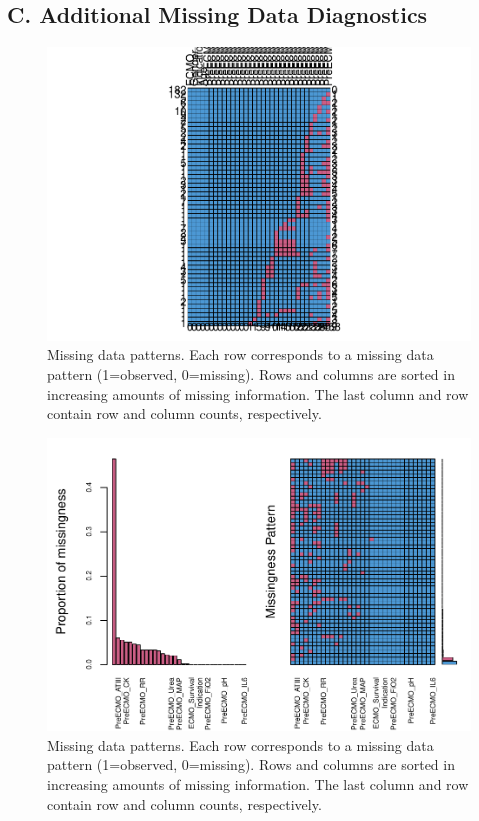 \documentclass[12pt,]{article}
\begin{document}
\subsection{C. Additional Missing Data
Diagnostics}\label{c.-additional-missing-data-diagnostics}

\begin{figure}[H]

{\centering \includegraphics[width=1\linewidth]{figure/graphics-unnamed-chunk-13-1} 

}

\caption{\label{fig:missing-data-patterns1}Missing data patterns.  Each row corresponds to a missing data pattern (1=observed, 0=missing).  Rows and columns are sorted in increasing amounts of missing information.  The last column and row contain row and column counts, respectively.}\label{fig:unnamed-chunk-13}
\end{figure}

\begin{figure}[H]

{\centering \includegraphics[width=1\linewidth]{figure/graphics-unnamed-chunk-14-1} 

}

\caption{\label{fig:missing-data-patterns2}Missing data patterns.  Each row corresponds to a missing data pattern (1=observed, 0=missing).  Rows and columns are sorted in increasing amounts of missing information.  The last column and row contain row and column counts, respectively.}\label{fig:unnamed-chunk-14}
\end{figure}
\end{document}
